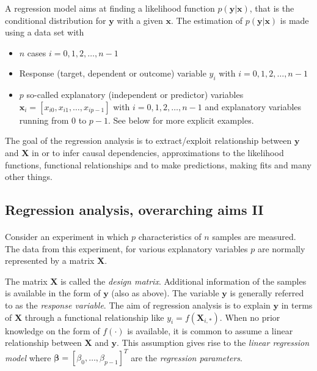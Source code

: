 \documentclass[%
oneside,                 %
final,                   %
10pt]{article}
\begin{document}
A regression model aims at finding a likelihood function $p(\bm{y}\vert \bm{x})$, that is the conditional distribution for $\bm{y}$ with a given $\bm{x}$. The estimation of  $p(\bm{y}\vert \bm{x})$ is made using a data set with 
\begin{itemize}
\item $n$ cases $i = 0, 1, 2, \dots, n-1$ 

\item Response (target, dependent or outcome) variable $y_i$ with $i = 0, 1, 2, \dots, n-1$ 

\item $p$ so-called explanatory (independent or predictor) variables $\bm{x}_i=[x_{i0}, x_{i1}, \dots, x_{ip-1}]$ with $i = 0, 1, 2, \dots, n-1$ and explanatory variables running from $0$ to $p-1$. See below for more explicit examples.   
\end{itemize}

\noindent
 The goal of the regression analysis is to extract/exploit relationship between $\bm{y}$ and $\bm{X}$ in or to infer causal dependencies, approximations to the likelihood functions, functional relationships and to make predictions, making fits and many other things.



\subsection*{Regression analysis, overarching aims II}

\paragraph{}


Consider an experiment in which $p$ characteristics of $n$ samples are
measured. The data from this experiment, for various explanatory variables $p$ are normally represented by a matrix  
$\mathbf{X}$.

The matrix $\mathbf{X}$ is called the \emph{design
matrix}. Additional information of the samples is available in the
form of $\bm{y}$ (also as above). The variable $\bm{y}$ is
generally referred to as the \emph{response variable}. The aim of
regression analysis is to explain $\bm{y}$ in terms of
$\bm{X}$ through a functional relationship like $y_i =
f(\mathbf{X}_{i,\ast})$. When no prior knowledge on the form of
$f(\cdot)$ is available, it is common to assume a linear relationship
between $\bm{X}$ and $\bm{y}$. This assumption gives rise to
the \emph{linear regression model} where $\bm{\beta} = [\beta_0, \ldots,
\beta_{p-1}]^{T}$ are the \emph{regression parameters}. 
\end{document}
